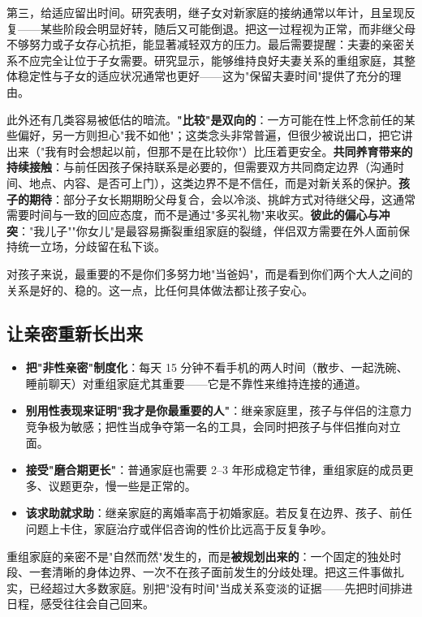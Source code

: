 第三，给适应留出时间。研究表明，继子女对新家庭的接纳通常以年计，且呈现反复——某些阶段会明显好转，随后又可能倒退。把这一过程视为正常，而非继父母不够努力或子女存心抗拒，能显著减轻双方的压力。最后需要提醒：夫妻的亲密关系不应完全让位于子女需要。研究显示，能够维持良好夫妻关系的重组家庭，其整体稳定性与子女的适应状况通常也更好——这为"保留夫妻时间"提供了充分的理由。

此外还有几类容易被低估的暗流。\textbf{"比较"是双向的}：一方可能在性上怀念前任的某些偏好，另一方则担心"我不如他"；这类念头非常普遍，但很少被说出口，把它讲出来（"我有时会想起以前，但那不是在比较你"）比压着更安全。\textbf{共同养育带来的持续接触}：与前任因孩子保持联系是必要的，但需要双方共同商定边界（沟通时间、地点、内容、是否可上门），这类边界不是不信任，而是对新关系的保护。\textbf{孩子的期待}：部分子女长期期盼父母复合，会以冷淡、挑衅方式对待继父母，这通常需要时间与一致的回应态度，而不是通过"多买礼物"来收买。\textbf{彼此的偏心与冲突}："我儿子""你女儿"是最容易撕裂重组家庭的裂缝，伴侣双方需要在外人面前保持统一立场，分歧留在私下谈。

\begin{tcolorbox}[colback=pink!5!white,colframe=red!50!black,title=贴心小叮咛]
对孩子来说，最重要的不是你们多努力地"当爸妈"，而是看到你们两个大人之间的关系是好的、稳的。这一点，比任何具体做法都让孩子安心。
\end{tcolorbox}
\subsection{让亲密重新长出来}

\begin{itemize}
  \item \textbf{把"非性亲密"制度化}：每天 15 分钟不看手机的两人时间（散步、一起洗碗、睡前聊天）对重组家庭尤其重要——它是不靠性来维持连接的通道。
  \item \textbf{别用性表现来证明"我才是你最重要的人"}：继亲家庭里，孩子与伴侣的注意力竞争极为敏感；把性当成争夺第一名的工具，会同时把孩子与伴侣推向对立面。
  \item \textbf{接受"磨合期更长"}：普通家庭也需要 2--3 年形成稳定节律，重组家庭的成员更多、议题更杂，慢一些是正常的。
  \item \textbf{该求助就求助}：继亲家庭的离婚率高于初婚家庭。若反复在边界、孩子、前任问题上卡住，家庭治疗或伴侣咨询的性价比远高于反复争吵。
\end{itemize}

\begin{tcolorbox}[colback=pink!5!white,colframe=red!50!black,title=贴心小叮咛]
重组家庭的亲密不是"自然而然"发生的，而是\textbf{被规划出来的}：一个固定的独处时段、一套清晰的身体边界、一次不在孩子面前发生的分歧处理。把这三件事做扎实，已经超过大多数家庭。别把"没有时间"当成关系变淡的证据——先把时间排进日程，感受往往会自己回来。
\end{tcolorbox}
